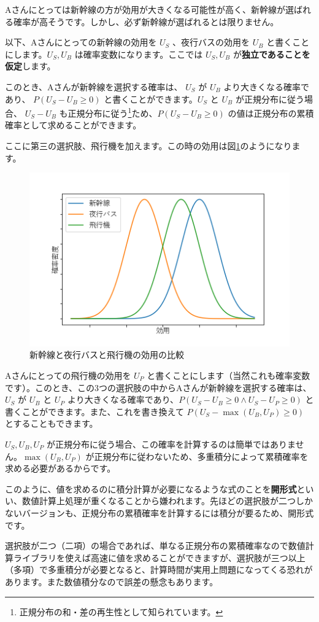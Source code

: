 Aさんにとっては新幹線の方が効用が大きくなる可能性が高く、新幹線が選ばれる確率が高そうです。しかし、必ず新幹線が選ばれるとは限りません。

以下、Aさんにとっての新幹線の効用を $U_S$ 、夜行バスの効用を $U_B$ と書くことにします。$U_S,U_B$ は確率変数になります。ここでは $U_S,U_B$ が\textbf{独立であることを仮定}します。

このとき、Aさんが新幹線を選択する確率は、 $U_S$ が $U_B$ より大きくなる確率であり、 $P(U_S-U_B \geq 0)$ と書くことができます。$U_S$ と $U_B$ が正規分布に従う場合、 $U_S-U_B$ も正規分布に従う\footnote{正規分布の和・差の再生性として知られています。}ため、$P(U_S-U_B \geq 0)$ の値は正規分布の累積確率として求めることができます。

ここに第三の選択肢、飛行機を加えます。この時の効用は図\ref{fig:norm2}のようになります。

\begin{figure}[ht]
    \centering
    \includegraphics[width=0.5\hsize]{figure/norm2.png}
    \caption{新幹線と夜行バスと飛行機の効用の比較}
    \label{fig:norm2}
\end{figure}


Aさんにとっての飛行機の効用を $U_P$ と書くことにします（当然これも確率変数です）。このとき、この3つの選択肢の中からAさんが新幹線を選択する確率は、 $U_S$ が $U_B$ と $U_P$ より大きくなる確率であり、$P(U_S-U_B \geq 0 \land U_S-U_P \geq 0)$ と書くことができます。また、これを書き換えて $P(U_S - \max(U_B,U_P) \geq 0)$ とすることもできます。

$U_S,U_B,U_P$ が正規分布に従う場合、この確率を計算するのは簡単ではありません。$\max(U_B,U_P)$ が正規分布に従わないため、多重積分によって累積確率を求める必要があるからです。

このように、値を求めるのに積分計算が必要になるような式のことを\textbf{開形式}といい、数値計算上処理が重くなることから嫌われます。先ほどの選択肢が二つしかないバージョンも、正規分布の累積確率を計算するには積分が要るため、開形式です。

選択肢が二つ（二項）の場合であれば、単なる正規分布の累積確率なので数値計算ライブラリを使えば高速に値を求めることができますが、選択肢が三つ以上（多項）で多重積分が必要となると、計算時間が実用上問題になってくる恐れがあります。また数値積分なので誤差の懸念もあります。

